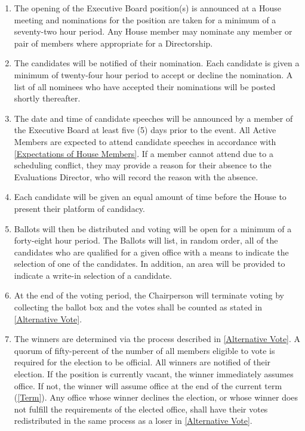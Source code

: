 \documentclass{article}
\begin{document}
\begin{enumerate}
	\item The opening of the Executive Board position(s) is announced at a House meeting and nominations for the position are taken for a minimum of a seventy-two hour period.
		Any House member may nominate any member or pair of members where appropriate for a Directorship.
	\item The candidates will be notified of their nomination.
		Each candidate is given a minimum of twenty-four hour period to accept or decline the nomination.
		A list of all nominees who have accepted their nominations will be posted shortly thereafter.
	\item The date and time of candidate speeches will be announced by a member of the Executive Board at least five (5) days prior to the event. 
		All Active Members are expected to attend candidate speeches in accordance with \ref{Expectations of House Members}.
		If a member cannot attend due to a scheduling conflict, they may provide a reason for their absence to the Evaluations Director, who will record the reason with the absence.
	\item Each candidate will be given an equal amount of time before the House to present their platform of candidacy.
	\item Ballots will then be distributed and voting will be open for a minimum of a forty-eight hour period.
		The Ballots will list, in random order, all of the candidates who are qualified for a given office with a means to indicate the selection of one of the candidates.
		In addition, an area will be provided to indicate a write-in selection of a candidate.
	\item At the end of the voting period, the Chairperson will terminate voting by collecting the ballot box and the votes shall be counted as stated in \ref{Alternative Vote}.
	\item The winners are determined via the process described in \ref{Alternative Vote}.
		A quorum of fifty-percent of the number of all members eligible to vote is required for the election to be official.
		All winners are notified of their election.
		If the position is currently vacant, the winner immediately assumes office.
		If not, the winner will assume office at the end of the current term (\ref{Term}).
		Any office whose winner declines the election, or whose winner does not fulfill the requirements of the elected office, shall have their votes redistributed in the same process as a loser in \ref{Alternative Vote}.
\end{enumerate}
\end{document}
